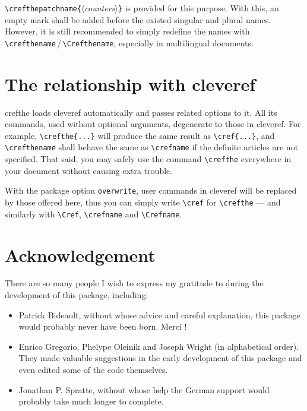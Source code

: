 \documentclass[classical]{einfart}
\newcommand{\meta}[1]{$\langle${\normalfont\itshape#1}$\rangle$}
\newcommand{\packageoption}[1]{\texttt{\textcolor{code-option}{#1}}}
\newcommand{\crefthepackage}{\textsf{crefthe}}
\begin{document}
\lstinline|\crefthepatchname{|\meta{counters}\lstinline|}| is provided for this purpose. With this, an empty mark shall be added before the existed singular and plural names. However, it is still recommended to simply redefine the names with \lstinline|\crefthename|\,/\,\lstinline|\Crefthename|, especially in multilingual documents.



\section{The relationship with \textsf{cleveref}}

\crefthepackage{} loads \textsf{cleveref} automatically and passes related options to it. All its commands, used without optional arguments, degenerate to those in \textsf{cleveref}. For example, \lstinline|\crefthe{...}|%
will produce the same result as \lstinline|\cref{...}|, and \lstinline|\crefthename| shall behave the same as \lstinline|\crefname| if the definite articles are not specified. That said, you may safely use the command \lstinline|\crefthe| everywhere in your document without causing extra trouble.

With the package option \packageoption{overwrite}, user commands in \textsf{cleveref} will be replaced by those offered here, thus you can simply write \lstinline|\cref| for \lstinline|\crefthe| --- and similarly with \lstinline|\Cref|, \lstinline|\crefname| and \lstinline|\Crefname|.


\clearpage


\section{Acknowledgement}

There are so many people I wish to express my gratitude to during the development of this package, including:

\begin{itemize}
    \item Patrick Bideault, without whose advice and careful explanation, this package would probably never have been born. Merci !
    \item Enrico Gregorio, Phelype Oleinik and Joseph Wright (in alphabetical order). They made valuable suggestions in the early development of this package and even edited some of the code themselves.
    \item Jonathan P. Spratte, without whose help the German support would probably take much longer to complete.
\end{itemize}
\end{document}
